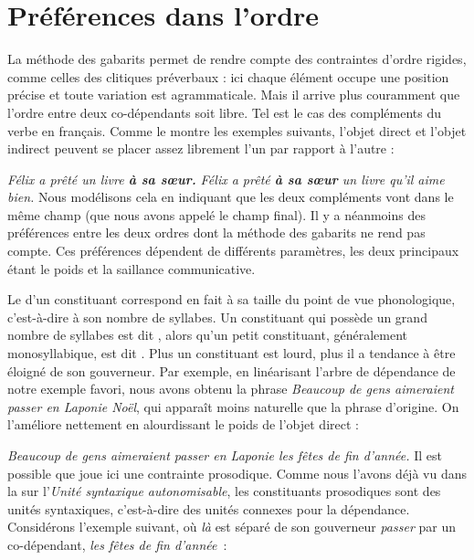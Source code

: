 \section{Préférences dans l’ordre}\label{sec:3.5.21}

La méthode des gabarits permet de rendre compte des contraintes d’ordre rigides, comme celles des clitiques préverbaux : ici chaque élément occupe une position précise et toute variation est agrammaticale. Mais il arrive plus couramment que l’ordre entre deux co-dépendants soit libre. Tel est le cas des compléments du verbe en français. Comme le montre les exemples suivants, l’objet direct et l’objet indirect peuvent se placer assez librement l’un par rapport à l’autre :

\ea \ea \textit{{Félix a prêté} un livre \textbf{{à sa sœur.}}}
    \ex \textit{{Félix a prêté} \textbf{{à sa sœur}} un livre qu’il aime bien.}
    \z
\z
Nous modélisons cela en indiquant que les deux compléments vont dans le même champ (que nous avons appelé le champ final). Il y a néanmoins des préférences entre les deux ordres dont la méthode des gabarits ne rend pas compte. Ces préférences dépendent de différents paramètres, les deux principaux étant le poids et la saillance communicative.

Le  d’un constituant correspond en fait à sa taille du point de vue phonologique, c’est-à-dire à son nombre de syllabes. Un constituant qui possède un grand nombre de syllabes est dit , alors qu’un petit constituant, généralement monosyllabique, est dit . Plus un constituant est lourd, plus il a tendance à être éloigné de son gouverneur. Par exemple, en linéarisant l’arbre de dépendance de notre exemple favori, nous avons obtenu la phrase \textit{Beaucoup de gens aimeraient passer en Laponie Noël}, qui apparaît moins naturelle que la phrase d’origine. On l’améliore nettement en alourdissant le poids de l’objet direct :

\ea
    {\itshape Beaucoup de gens aimeraient passer en Laponie les fêtes de fin d’année.}
\z
Il est possible que joue ici une contrainte prosodique. Comme nous l’avons déjà vu dans la  sur l’\textit{Unité syntaxique autonomisable}, les constituants prosodiques sont des unités syntaxiques, c’est-à-dire des unités connexes pour la dépendance. Considérons l’exemple suivant, où \textit{là} est séparé de son gouverneur \textit{passer} par un co-dépendant, \textit{les fêtes de fin d’année~}:

